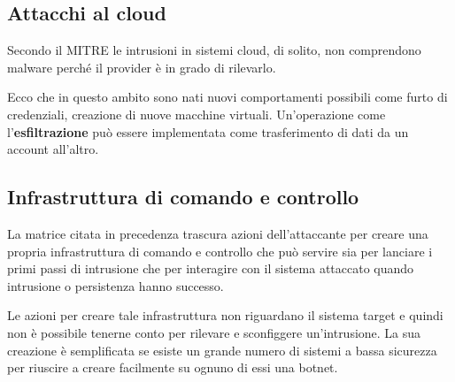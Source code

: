 \subsection{Attacchi al cloud}
Secondo il MITRE le intrusioni in sistemi cloud, di solito, non comprendono malware perché il provider è in grado di
rilevarlo.

Ecco che in questo ambito sono nati nuovi comportamenti possibili come furto di credenziali, creazione di nuove
macchine virtuali. Un'operazione come l'\textbf{esfiltrazione} può essere implementata come trasferimento di dati
da un account all'altro.

\subsection{Infrastruttura di comando e controllo}
La matrice citata in precedenza trascura azioni dell'attaccante per creare una propria infrastruttura di comando e
controllo che può servire sia per lanciare i primi passi di intrusione che per interagire con il sistema attaccato
quando intrusione o persistenza hanno successo.

Le azioni per creare tale infrastruttura non riguardano il sistema target e quindi non è possibile tenerne conto per
rilevare e sconfiggere un'intrusione. La sua creazione è semplificata se esiste un grande numero di sistemi a bassa
sicurezza per riuscire a creare facilmente su ognuno di essi una botnet.